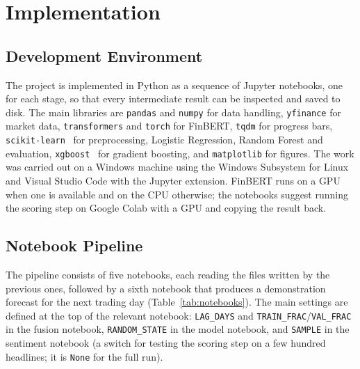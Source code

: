 \chapter{Implementation}

\section{Development Environment}
The project is implemented in Python as a sequence of Jupyter notebooks, one for each stage, so that every intermediate result can be inspected and saved to disk. The main libraries are \texttt{pandas} and \texttt{numpy} for data handling, \texttt{yfinance} for market data, \texttt{transformers} and \texttt{torch} for FinBERT, \texttt{tqdm} for progress bars, \texttt{scikit-learn}~\cite{pedregosa2011scikit} for preprocessing, Logistic Regression, Random Forest and evaluation, \texttt{xgboost}~\cite{chen2016xgboost} for gradient boosting, and \texttt{matplotlib} for figures. The work was carried out on a Windows machine using the Windows Subsystem for Linux and Visual Studio Code with the Jupyter extension. FinBERT runs on a GPU when one is available and on the CPU otherwise; the notebooks suggest running the scoring step on Google Colab with a GPU and copying the result back.

\section{Notebook Pipeline}
The pipeline consists of five notebooks, each reading the files written by the previous ones, followed by a sixth notebook that produces a demonstration forecast for the next trading day (Table~\ref{tab:notebooks}). The main settings are defined at the top of the relevant notebook: \texttt{LAG\_DAYS} and \texttt{TRAIN\_FRAC}/\texttt{VAL\_FRAC} in the fusion notebook, \texttt{RANDOM\_STATE} in the model notebook, and \texttt{SAMPLE} in the sentiment notebook (a switch for testing the scoring step on a few hundred headlines; it is \texttt{None} for the full run).

